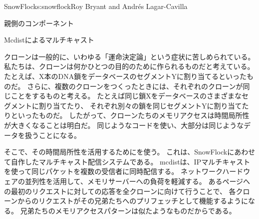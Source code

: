 \begin{aosachapter}{SnowFlock}{s:snowflock}{Roy Bryant and Andr\'e{s} Lagar-Cavilla}
\begin{aosasect1}{親側のコンポーネント}
\begin{aosasect2}{Mcdistによるマルチキャスト}

クローンは一般的に、いわゆる「運命決定論」という症状に苦しめられている。
私たちは、クローンは何かひとつの目的のために作られるものだと考えている。
たとえば、X本のDNA鎖をデータベースのセグメントYに割り当てるといったものだ。
さらに、複数のクローンをつくったときには、それぞれのクローンが同じことをするものと考える。
たとえば同じ鎖Xをデータベースのさまざまなセグメントに割り当てたり、
それぞれ別々の鎖を同じセグメントYに割り当てたりといったものだ。
したがって、クローンたちのメモリアクセスは時間局所性が大きくなることは明白だ。
同じようなコードを使い、大部分は同じようなデータを扱うことになる。

そこで、その時間局所性を活用するためにを使う。
これは、SnowFlockにあわせて自作したマルチキャスト配信システムである。
mcdistは、IPマルチキャストを使って同じパケットを複数の受信者に同時配信する。
ネットワークハードウェアの並列性を活用して、メモリサーバーへの負荷を軽減する。
あるページへの最初のリクエストに対しての応答を全クローンに向けて行うことで、
各クローンからのリクエストがその兄弟たちへのプリフェッチとして機能するようになる。
兄弟たちのメモリアクセスパターンは似たようなものだからである。


\end{aosasect2}
\end{aosasect1}
\end{aosachapter}
